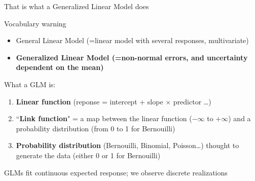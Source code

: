 \documentclass{beamer}\usepackage[]{graphicx}\usepackage[]{color}
\begin{document}
\begin{frame}{That is what a Generalized Linear Model does}

\begin{block}{Vocabulary warning}
  \begin{itemize}
    \item General Linear Model (=linear model with several responses, multivariate)
    \item \textbf{Generalized Linear Model (=non-normal errors, and uncertainty dependent on the mean)} 
  \end{itemize}
\end{block}

\pause

\begin{block}{What a GLM is:}
  \begin{enumerate}[<+->]
    \item \textbf{Linear function} (reponse = intercept + slope $\times$ predictor \dots)
    \item ``\textbf{Link function}" = a map between the linear function ($-\infty$ to $+\infty$) and a probability distribution (from 0 to 1 for Bernouilli)
    \item \textbf{Probability distribution} (Bernouilli, Binomial, Poisson\dots) thought to generate the data (either 0 or 1 for Bernouilli)
  \end{enumerate}
\pause[\thebeamerpauses]

GLMs fit continuous expected response; we observe discrete realizations
\end{block}

\end{frame}
\end{document}
